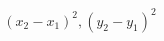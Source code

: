 \documentclass[preview]{standalone}
\begin{document}
\begin{align*}
(x_2-x_1)^2, (y_2-y_1)^2
\end{align*}
\end{document}
